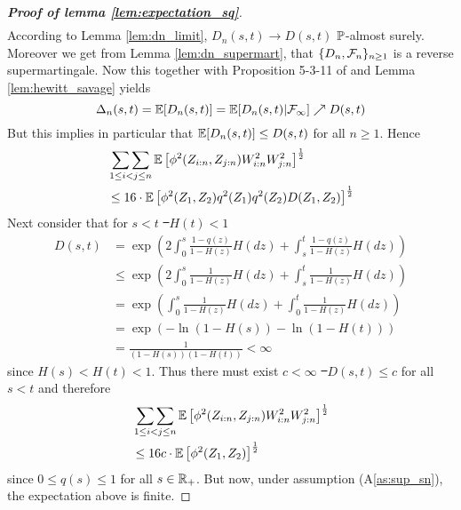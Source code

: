 \begin{proof}[\textbf{Proof of lemma \ref{lem:expectation_sq}}]
\begin{align*}
	\end{align*}	
	According to Lemma \ref{lem:dn_limit}, $D_n(s,t) \to D(s,t)$ $\P$-almost surely. Moreover we get from Lemma \ref{lem:dn_supermart}, that $\{D_n,\F_n\}_{n\geq 1}$ is a reverse supermartingale. Now this together with Proposition 5-3-11 of \cite{neveu1975discrete} and Lemma \ref{lem:hewitt_savage} yields
	$$\Delta_{n}(s,t) = \E[D_n(s,t)] = \E[D_n(s,t)|\F_\infty] \nearrow D(s,t)$$
	But this implies in particular that $\E[D_n(s,t)] \leq D(s,t)$ for all $n\geq 1$. Hence 
	\begin{align*}
		&\doublesum\limits_{1\leq i<j\leq n}\E\left[\phi^2(Z_{i:n}, Z_{j:n}) W^2_{i:n} W^2_{j:n}\right]^{\frac{1}{2}}\\
		&\leq 16\cdot\E\left[\phi^2(Z_{1}, Z_{2}) q^2(Z_{1})q^2(Z_{2})D(Z_1,Z_2)\right]^{\frac{1}{2}}
	\end{align*}		
	Next consider that for $s<t$ \st\ $H(t)<1$
	\begin{align*}
		D(s,t) &= \exp\left(2\int_{0}^{s} \frac{1-q(z)}{1-H(z)} H(dz) + \int_{s}^{t} \frac{1-q(z)}{1-H(z)} H(dz)\right)\\
		&\leq \exp\left(2\int_{0}^{s} \frac{1}{1-H(z)} H(dz) + \int_{s}^{t} \frac{1}{1-H(z)} H(dz)\right)\\
		&= \exp\left(\int_{0}^{s} \frac{1}{1-H(z)} H(dz) + \int_{0}^{t} \frac{1}{1-H(z)} H(dz)\right)\\
		&= \exp\left(-\ln(1-H(s)) -\ln(1-H(t))\right)\\
		&= \frac{1}{(1-H(s))(1-H(t))} < \infty
	\end{align*}
	since $H(s)<H(t)<1$. Thus there must exist $c<\infty$ \st\ $D(s,t)\leq c$ for all $s<t$ and therefore
	\begin{align*}
		&\doublesum\limits_{1\leq i<j\leq n}\E\left[\phi^2(Z_{i:n}, Z_{j:n}) W^2_{i:n} W^2_{j:n}\right]^{\frac{1}{2}}\\
		&\leq 16c\cdot\E\left[\phi^2(Z_{1}, Z_{2}) \right]^{\frac{1}{2}}
	\end{align*}	
	since $0\leq q(s)\leq 1$ for all $s\in\R_+$. But now, under assumption (A\ref{as:sup_sn}), the expectation above is finite.
\end{proof}
